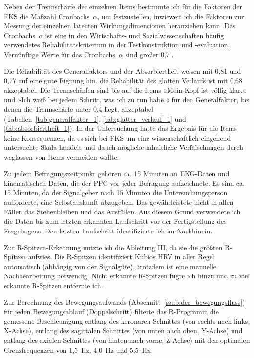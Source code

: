 Neben der Trennschärfe der einzelnen Items bestimmte ich für die Faktoren der \ac{FKS} die Maßzahl Cronbachs~$\alpha$, um festzustellen, inwieweit ich die Faktoren zur Messung der einzelnen latenten Wirkungsdimensionen heranziehen kann. Das Cronbachs~$\alpha$ ist eine in den Wirtschafts- und Sozialwissenschaften häufig verwendetes Reliabilitätskriterium in der Testkonstruktion und -evaluation. Vernünftige Werte für das Cronbachs~$\alpha$ sind größer 0,7 \citep[][S.~189f.]{Bortz2006}.

Die Reliabilität des Generalfaktors und der Absorbiertheit weisen mit 0,81 und 0,77 auf eine gute Eignung hin, die Reliabilität des glatten Verlaufs ist mit 0,68 akzeptabel. Die Trennschärfen sind bis auf die Items »Mein Kopf ist völlig klar.« und »Ich weiß bei jedem Schritt, was ich zu tun habe.« für den Generalfaktor, bei denen die Trennschärfe unter 0,4 liegt, akzeptabel (Tabellen~\ref{tab:generalfaktor_1}, \ref{tab:glatter_verlauf_1} und \ref{tab:absorbiertheit_1}). In der Untersuchung hatte das Ergebnis für die Items keine Konsequenzen, da es sich bei \ac{FKS} um eine wissenschaftlich eingehend untersuchte Skala handelt und da ich mögliche inhaltliche Verfälschungen durch weglassen von Items vermeiden wollte.

Zu jedem Befragungszeitpunkt gehören ca. 15 Minuten an \ac{EKG}-Daten und kinematischen Daten, die der \ac{PPC} vor jeder Befragung aufzeichnete. Es sind ca. 15 Minuten, da der Signalgeber nach 15 Minuten die Untersuchungsperson aufforderte, eine Selbstauskunft abzugeben. Das gewährleistete nicht in allen Fällen das Stehenbleiben und das Ausfüllen. Aus diesem Grund verwendete ich die Daten bis zum letzten erkannten Laufschritt vor der Fertigstellung des Fragebogens. Den letzten Laufschritt identifizierte ich im Nachhinein. 

Zur R-Spitzen-Erkennung nutzte ich die Ableitung III, da sie die größten R-Spitzen aufwies. Die R-Spitzen identifiziert Kubios \ac{HRV} in aller Regel automatisch (abhängig von der Signalgüte), trotzdem ist eine manuelle Nachbearbeitung notwendig. Nicht erkannte R-Spitzen fügte ich hinzu und zu viel erkannte R-Spitzen entfernte ich. 

Zur Berechnung des Bewegungsaufwands (Abschnitt~\ref{ssub:der_bewegungsfluss}) für jeden Bewegungsablauf (Doppelschritt) filterte das R-Programm die gemessene Beschleunigung entlang des koronaren Schnittes (von rechts nach links, X-Achse), entlang des sagittalen Schnittes (von unten nach oben, Y-Achse) und entlang des axialen Schnittes (von hinten nach vorne, Z-Achse) mit den optimalen Grenzfrequenzen von 1,5~Hz, 4,0~Hz und 5,5~Hz.

